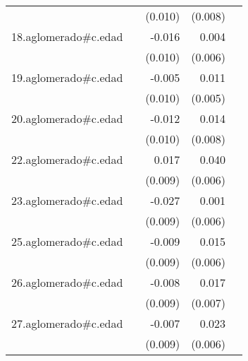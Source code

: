 {\begin{longtable}{l*{4}{D{.}{.}{-1}}}
            &                     &     (0.010)         &     (0.008)         &                     \\
\addlinespace
18.aglomerado#c.edad&                     &      -0.016         &       0.004         &                     \\
            &                     &     (0.010)         &     (0.006)         &                     \\
\addlinespace
19.aglomerado#c.edad&                     &      -0.005         &       0.011\sym{*}  &                     \\
            &                     &     (0.010)         &     (0.005)         &                     \\
\addlinespace
20.aglomerado#c.edad&                     &      -0.012         &       0.014         &                     \\
            &                     &     (0.010)         &     (0.008)         &                     \\
\addlinespace
22.aglomerado#c.edad&                     &       0.017         &       0.040\sym{***}&                     \\
            &                     &     (0.009)         &     (0.006)         &                     \\
\addlinespace
23.aglomerado#c.edad&                     &      -0.027\sym{**} &       0.001         &                     \\
            &                     &     (0.009)         &     (0.006)         &                     \\
\addlinespace
25.aglomerado#c.edad&                     &      -0.009         &       0.015\sym{*}  &                     \\
            &                     &     (0.009)         &     (0.006)         &                     \\
\addlinespace
26.aglomerado#c.edad&                     &      -0.008         &       0.017\sym{**} &                     \\
            &                     &     (0.009)         &     (0.007)         &                     \\
\addlinespace
27.aglomerado#c.edad&                     &      -0.007         &       0.023\sym{***}&                     \\
            &                     &     (0.009)         &     (0.006)         &                     \\

\end{longtable}}

